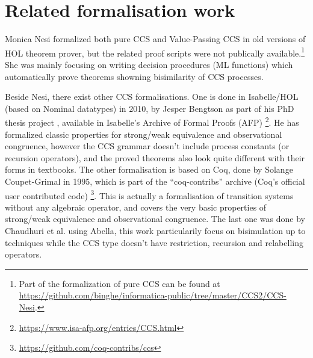 \section{Related formalisation work}

Monica Nesi formalized both pure CCS \cite{Nesi:1992ve} and Value-Passing CCS
\cite{Nesi:2017wo} in old versions of HOL theorem prover, but the
related proof scripts were not publically available.\footnote{Part of
 the formalization of pure CCS can be found at \url{https://github.com/binghe/informatica-public/tree/master/CCS2/CCS-Nesi}.}
She was mainly focusing on writing decision procedures (ML functions) which
automatically prove theorems showning bisimilarity of CCS
processes.%

Beside Nesi, there exist other CCS formalisations. One
is done in Isabelle/HOL (based on Nominal datatypes) in 2010, by Jesper Bengtson as part of his PhD
thesis project \cite{bengtson2010formalising}, available in Isabelle's Archive of Formal
Proofs (AFP) \footnote{\url{https://www.isa-afp.org/entries/CCS.html}}. He has formalized
classic properties for strong/weak equivalence and observational
congruence, however the CCS grammar doesn't include process constants
(or recursion operators), and the proved theorems also look quite
different with their forms in textbooks.%
The other formalisation is based on Coq, done by Solange
Coupet-Grimal in 1995, which is part of the
``coq-contribs'' archive (Coq's official user contributed code)
\footnote{\url{https://github.com/coq-contribs/ccs}}. This is actually
a formalisation of transition systems without any algebraic operator,
and covers the very basic properties of strong/weak equivalence and observational
congruence. The last one was done by Chaudhuri et
al. \cite{chaudhuri2014formalization} using Abella, this work
particularily focus on bisimulation up to techniques while the CCS
type doesn't have restriction, recursion and relabelling operators.
